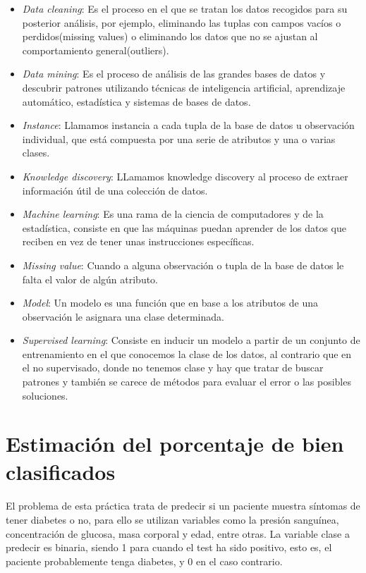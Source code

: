 \documentclass[es]{ifirak}
\begin{document}
\begin{itemize}
\item \emph{Data cleaning}: Es el proceso en el que se tratan los datos recogidos para su posterior análisis, por ejemplo, eliminando las tuplas con campos vacíos o perdidos(missing values) o eliminando los datos que no se ajustan al comportamiento general(outliers).

\item \emph{Data mining}: Es el proceso de análisis de las grandes bases de datos y descubrir patrones utilizando técnicas de inteligencia artificial, aprendizaje automático, estadística y sistemas de bases de datos.

\item \emph{Instance}: Llamamos instancia a cada tupla de la base de datos u observación individual, que está compuesta por una serie de atributos y una o varias clases.

\item \emph{Knowledge discovery}: LLamamos knowledge discovery al proceso de extraer información útil de una colección de datos.

\item \emph{Machine learning}: Es una rama de la ciencia de computadores y de la estadística, consiste en que las máquinas puedan aprender de los datos que reciben en vez de tener unas instrucciones específicas.

\item \emph{Missing value}: Cuando a alguna observación o tupla de la base de datos le falta el valor de algún atributo.

\item \emph{Model}: Un modelo es una función que en base a los atributos de una observación le asignara una clase determinada. 

\item \emph{Supervised learning}: Consiste en inducir un modelo a partir de un conjunto de entrenamiento en el que conocemos la clase de los datos, al contrario que en el no supervisado, donde no tenemos clase y hay que tratar de buscar patrones y también se carece de métodos para evaluar el error o las posibles soluciones.

\end{itemize}

\section{Estimación del porcentaje de bien clasificados}

\paragraph{}
El problema de esta práctica trata de predecir si un paciente muestra síntomas de tener diabetes o no, para ello se utilizan variables como la presión sanguínea, concentración de glucosa, masa corporal y edad, entre otras. La variable clase a predecir es binaria, siendo 1 para cuando el test ha sido positivo, esto es, el paciente probablemente tenga diabetes, y 0 en el caso contrario. 
\end{document}
